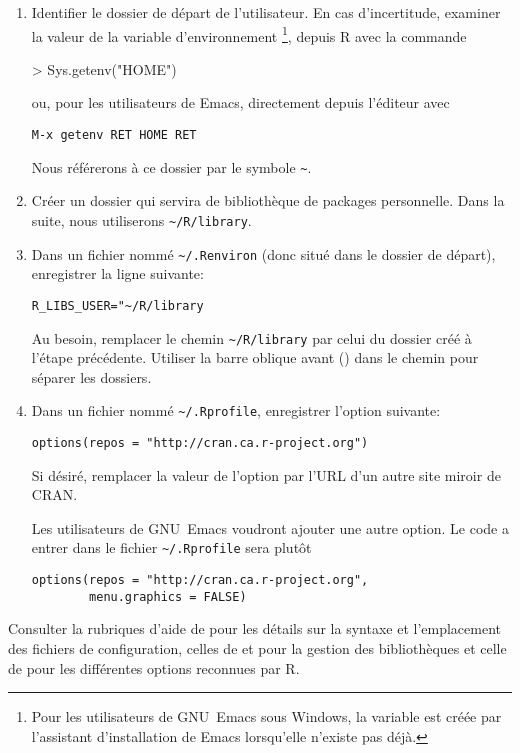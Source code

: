 \begin{enumerate}
\item Identifier le dossier de départ de l'utilisateur. En cas
  d'incertitude, examiner la valeur de la variable d'environnement
  \footnote{%
    Pour les utilisateurs de GNU~Emacs sous Windows, la variable est
    créée par l'assistant d'installation de Emacs lorsqu'elle n'existe
    pas déjà.}, %
  depuis R avec la commande
\begin{Sinput}
> Sys.getenv("HOME")
\end{Sinput}
  ou, pour les utilisateurs de Emacs, directement depuis l'éditeur avec
\begin{verbatim}
M-x getenv RET HOME RET
\end{verbatim}
  Nous référerons à ce dossier par le symbole \verb=~=.
\item Créer un dossier qui servira de bibliothèque de packages
  personnelle. Dans la suite, nous utiliserons \verb=~/R/library=.
\item Dans un fichier nommé \verb=~/.Renviron= (donc situé dans le
  dossier de départ), enregistrer la ligne suivante:
\begin{verbatim}
R_LIBS_USER="~/R/library
\end{verbatim}
  Au besoin, remplacer le chemin \verb=~/R/library= par celui du
  dossier créé à l'étape précédente. Utiliser la barre oblique avant
  (\code{/}) dans le chemin pour séparer les dossiers.
\item Dans un fichier nommé \verb=~/.Rprofile=, enregistrer l'option
  suivante:
\begin{verbatim}
options(repos = "http://cran.ca.r-project.org")
\end{verbatim}
  Si désiré, remplacer la valeur de l'option  par l'URL
  d'un autre site miroir de CRAN.

  Les utilisateurs de GNU~Emacs voudront ajouter une autre option. Le
  code a entrer dans le fichier \verb=~/.Rprofile= sera plutôt
\begin{verbatim}
options(repos = "http://cran.ca.r-project.org",
        menu.graphics = FALSE)
\end{verbatim}
\end{enumerate}
Consulter la rubriques d'aide de  pour les détails sur
la syntaxe et l'emplacement des fichiers de configuration, celles de
 et  pour la gestion des bibliothèques
et celle de  pour les différentes options reconnues par
R.

